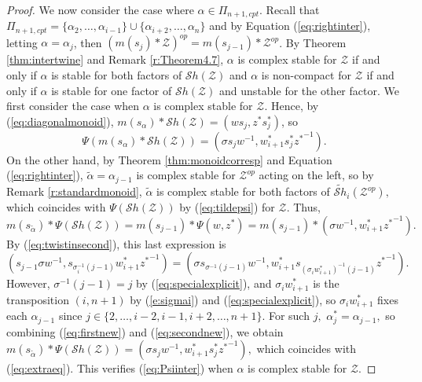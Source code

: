 \documentclass[12pt]{amsart}
\numberwithin{equation}{section}
\newcommand{\cZ}{{\mathcal Z}}
\newcommand{\alphatilde}{{\tilde{\alpha}}}
\newcommand{\ms}{m(s_{\alpha})}
\newcommand{\Sh}{\mathcal{S}h}
\begin{document}
\begin{proof}
 We now consider the case where $\alpha\in\Pi_{n+1,cpt}$.  Recall that $\Pi_{n+1,cpt}=\{\alpha_{2},\dots, \alpha_{i-1}\}\cup \{\alpha_{i+2},\dots, \alpha_{n}\}$ and by Equation (\ref{eq:rightinter}), letting $\alpha=\alpha_{j}$, then $(m(s_{j})*\cZ)^{op}=m(s_{j-1})*\cZ^{op}$.   By Theorem \ref{thm:intertwine} and Remark \ref{r:Theorem4.7}, $\alpha$ is complex stable for $\cZ$ if and only if $\alpha$ is stable for both factors of $\Sh(\cZ)$ and $\alpha$ is non-compact for $\cZ$ if and only if $\alpha$ is stable for one factor of $\Sh(\cZ)$ and unstable for the other factor.  We first consider the case when $\alpha$ is complex stable for $\cZ$.   Hence, by (\ref{eq:diagonalmonoid}), $\ms*\Sh(\cZ)=(ws_{j},z^*s_{j}^{*})$, so
\begin{equation}\label{eq:extraeq}
\Psi(\ms*\Sh(\cZ))=(\sigma s_jw^{-1},w_{i+1}^{*}s_{j}^{*}{z^{*}}^{-1}).
\end{equation}
 On the other hand, by Theorem \ref{thm:monoidcorresp} and Equation (\ref{eq:rightinter}), $\tilde{\alpha}=\alpha_{j-1}$ is complex stable for ${\cZ}^{op}$ acting on the left, so by Remark \ref{r:standardmonoid}, $\alphatilde$ is complex stable for both factors of $\widetilde{\Sh}_{i}({\cZ}^{op}),$ which coincides with $\Psi(\Sh(\cZ))$ by (\ref {eq:tildepsi}) for $\cZ.$  Thus, 
\begin{equation}\label{eq:firstnew}
m(s_{\alphatilde})*\Psi(\Sh(\cZ))=m(s_{j-1})*\Psi(w,z^*)=m(s_{j-1})*(\sigma w^{-1}, w_{i+1}^{*}{z^{*}}^{-1}). 
\end{equation}
By (\ref{eq:twistinsecond}), this last expression is
\begin{equation}\label{eq:secondnew}
(s_{j-1}\sigma w^{-1}, s_{\sigma_{i}^{-1}(j-1)}w_{i+1}^{*}{z^*}^{-1})=(\sigma s_{\sigma^{-1}(j-1)}w^{-1},w_{i+1}^{*}s_{(\sigma_{i} w_{i+1}^{*})^{-1}(j-1)}{z^{*}}^{-1}).
\end{equation}
However, $\sigma^{-1}(j-1)=j$ by (\ref{eq:specialexplicit}), and $\sigma_{i} w_{i+1}^{*}$ is the transposition $(i, n+1)$ by (\ref{e:sigmai}) and (\ref{eq:specialexplicit}), so $\sigma_{i} w_{i+1}^{*}$ fixes each $\alpha_{j-1}$ since  $j\in \{ 2, \dots, i-2, i-1, i+2, \dots, n+1 \}.$  For such $j,$
$\alpha_{j}^{*}=\alpha_{j-1},$ so combining (\ref{eq:firstnew}) and (\ref{eq:secondnew}), we obtain $m(s_{\alphatilde})*\Psi(\Sh(\cZ))=(\sigma s_{j} w^{-1},w_{i+1}^{*}s_{j}^{*}{z^*}^{-1}),$ which coincides with (\ref{eq:extraeq}).  This verifies (\ref{eq:Psiinter}) when $\alpha$ is complex stable for $\cZ.$


\end{proof}
\end{document}
